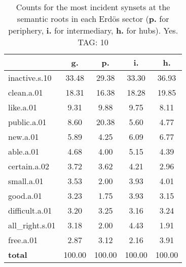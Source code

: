 \begin{table}[h!]
\begin{center}
\begin{tabular}{| l || c | c | c | c |}\hline
 & {\bf g.} & {\bf p.} & {\bf i.} & {\bf h.} \\\hline\hline
inactive.s.10 & 33.48  & 29.38  & 33.30  & 36.93 \\\hline
clean.a.01 & 18.31  & 16.38  & 18.28  & 19.85 \\\hline
like.a.01 & 9.31  & 9.88  & 9.75  & 8.11 \\\hline
public.a.01 & 8.60  & 20.38  & 5.60  & 4.77 \\\hline
new.a.01 & 5.89  & 4.25  & 6.09  & 6.77 \\\hline
able.a.01 & 4.68  & 4.00  & 5.15  & 4.39 \\\hline
certain.a.02 & 3.72  & 3.62  & 4.21  & 2.96 \\\hline
small.a.01 & 3.53  & 2.00  & 3.93  & 4.01 \\\hline
good.a.01 & 3.23  & 1.75  & 3.93  & 3.15 \\\hline
difficult.a.01 & 3.20  & 3.25  & 3.16  & 3.24 \\\hline
all\_right.s.01 & 3.18  & 2.00  & 4.43  & 1.91 \\\hline
free.a.01 & 2.87  & 3.12  & 2.16  & 3.91 \\\hline\hline
{{\bf total}} & 100.00  & 100.00  & 100.00  & 100.00 \\\hline
\end{tabular}
\caption{Counts for the most incident synsets at the semantic roots in each Erd\"os sector ({\bf p.} for periphery, {\bf i.} for intermediary, {\bf h.} for hubs). Yes. TAG: 10}
\end{center}
\end{table}